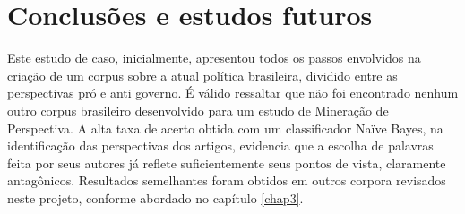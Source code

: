 






\section{Conclusões e estudos futuros}
\label{estudo:sec4}

Este estudo de caso, inicialmente, apresentou todos os passos envolvidos na criação de um corpus sobre a atual política brasileira, dividido entre as perspectivas pró e anti governo. É válido ressaltar que não foi encontrado nenhum outro corpus brasileiro desenvolvido para um estudo de Mineração de Perspectiva. A alta taxa de acerto obtida com um classificador Naïve Bayes, na identificação das perspectivas dos artigos, evidencia que a escolha de palavras feita por seus autores já reflete suficientemente seus pontos de vista, claramente antagônicos. Resultados semelhantes foram obtidos em outros corpora revisados neste projeto, conforme abordado no capítulo \ref{chap3}. %


